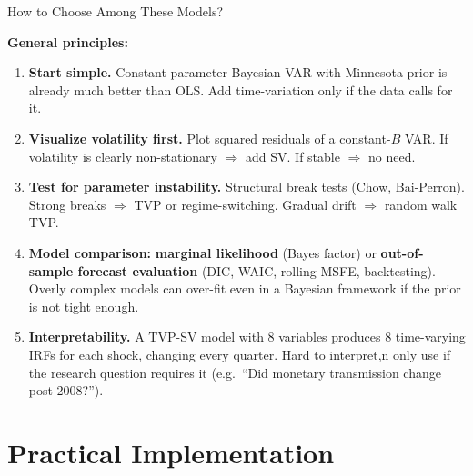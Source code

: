 \documentclass{beamer}
\begin{document}
\begin{frame}{How to Choose Among These Models?}
\footnotesize

\textbf{General principles:}

\begin{enumerate}
  \item \textbf{Start simple.} Constant-parameter Bayesian VAR with Minnesota prior is already much better
        than OLS. Add time-variation only if the data calls for it.

  \item \textbf{Visualize volatility first.} Plot squared residuals of a constant-$B$ VAR.
        If volatility is clearly non-stationary $\Rightarrow$ add SV. If stable $\Rightarrow$ no need.

  \item \textbf{Test for parameter instability.} Structural break tests (Chow, Bai-Perron).
        Strong breaks $\Rightarrow$ TVP or regime-switching. Gradual drift $\Rightarrow$ random walk TVP.

  \item \textbf{Model comparison:}\textbf{ marginal likelihood} (Bayes factor) or
        \textbf{out-of-sample forecast evaluation} (DIC, WAIC, rolling MSFE, backtesting).
        Overly complex models can over-fit even in a Bayesian framework if the prior is not tight enough.

  \item \textbf{Interpretability.} A TVP-SV model with 8 variables produces 8 time-varying IRFs
        for each shock, changing every quarter. Hard to interpret,n only use if the research question requires it (e.g.\ ``Did monetary transmission change post-2008?'').
\end{enumerate}

\end{frame}


\section{Practical Implementation}
\end{document}
